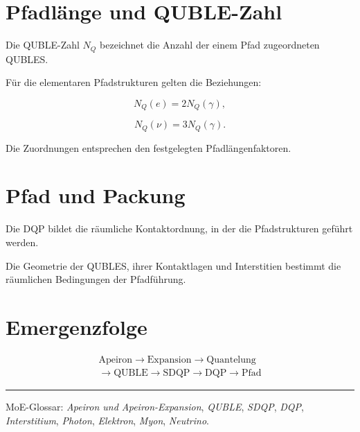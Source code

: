 \documentclass[11pt,a4paper]{article}
\begin{document}
\section*{Pfadlänge und QUBLE-Zahl}

Die QUBLE-Zahl $N_Q$
bezeichnet die Anzahl
der einem Pfad zugeordneten
QUBLES.

Für die elementaren
Pfadstrukturen gelten
die Beziehungen:

\[
N_Q(e)=2N_Q(\gamma),
\]

\[
N_Q(\nu)=3N_Q(\gamma).
\]

Die Zuordnungen entsprechen
den festgelegten
Pfadlängenfaktoren.

\section*{Pfad und Packung}

Die DQP bildet die räumliche
Kontaktordnung, in der die
Pfadstrukturen geführt werden.

Die Geometrie der QUBLES,
ihrer Kontaktlagen und
Interstitien bestimmt die
räumlichen Bedingungen
der Pfadführung.

\section*{Emergenzfolge}

\[
\begin{gathered}
\text{Apeiron}
\rightarrow
\text{Expansion}
\rightarrow
\text{Quantelung}
\\[0.4em]
\rightarrow
\text{QUBLE}
\rightarrow
\text{SDQP}
\rightarrow
\text{DQP}
\rightarrow
\text{Pfad}
\end{gathered}
\]

\vspace{0.9em}
\hrule
\vspace{0.45em}

{\footnotesize
MoE-Glossar:
\emph{Apeiron und Apeiron-Expansion},
\emph{QUBLE},
\emph{SDQP},
\emph{DQP},
\emph{Interstitium},
\emph{Photon},
\emph{Elektron},
\emph{Myon},
\emph{Neutrino}.
}
\end{document}
